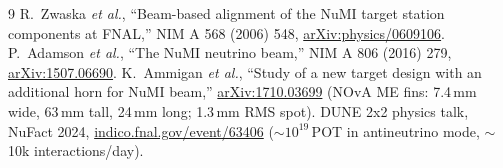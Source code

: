 \documentclass[11pt]{article}
\begin{document}
\begin{thebibliography}{9}
 R.~Zwaska \emph{et al.}, ``Beam-based alignment of the NuMI target
station components at FNAL,'' NIM A 568 (2006) 548, \href{https://arxiv.org/abs/physics/0609106}{arXiv:physics/0609106}.
 P.~Adamson \emph{et al.}, ``The NuMI neutrino beam,'' NIM A 806 (2016) 279,
\href{https://arxiv.org/abs/1507.06690}{arXiv:1507.06690}.
 K.~Ammigan \emph{et al.}, ``Study of a new target design with an
additional horn for NuMI beam,'' \href{https://arxiv.org/abs/1710.03699}{arXiv:1710.03699}
(NOvA ME fins: 7.4\,mm wide, 63\,mm tall, 24\,mm long; 1.3\,mm RMS spot).
 DUNE 2x2 physics talk, NuFact 2024,
\href{https://indico.fnal.gov/event/63406/contributions/297555/}{indico.fnal.gov/event/63406}
($\sim10^{19}$\,POT in antineutrino mode, $\sim$10k interactions/day).
\end{thebibliography}
\end{document}
